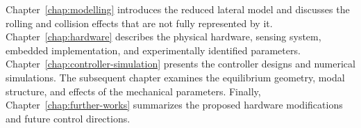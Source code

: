 Chapter~\ref{chap:modelling} introduces the reduced lateral model and discusses the rolling and collision effects that are not fully represented by it. Chapter~\ref{chap:hardware} describes the physical hardware, sensing system, embedded implementation, and experimentally identified parameters. Chapter~\ref{chap:controller-simulation} presents the controller designs and numerical simulations. The subsequent chapter examines the equilibrium geometry, modal structure, and effects of the mechanical parameters. Finally, Chapter~\ref{chap:further-works} summarizes the proposed hardware modifications and future control directions.